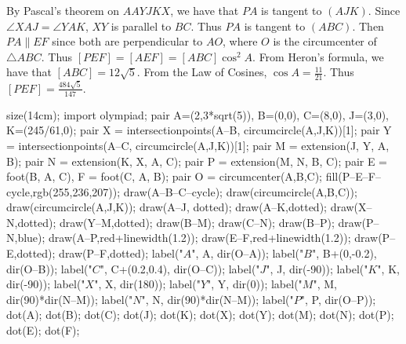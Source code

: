 By Pascal's theorem on $AAYJKX$, we have that $PA$ is tangent to $(AJK)$. Since $\angle{XAJ}=\angle{YAK}$, $XY$ is parallel to $BC$. Thus $PA$ is tangent to $(ABC)$. Then $PA\parallel EF$ since both are perpendicular to $AO$, where $O$ is the circumcenter of $\triangle{ABC}$. Thus $[PEF]=[AEF]=[ABC]\cos^2 A$. From Heron's formula, we have that $[ABC]=12\sqrt{5}$. From the Law of Cosines, $\cos A=\frac{11}{21}$. Thus $[PEF]=\frac{484\sqrt{5}}{147}$.
	\begin{center}
		\begin{asy}
			size(14cm);
			import olympiad;
			pair A=(2,3*sqrt(5)), B=(0,0), C=(8,0), J=(3,0), K=(245/61,0);
			pair X = intersectionpoints(A--B, circumcircle(A,J,K))[1];
			pair Y = intersectionpoints(A--C, circumcircle(A,J,K))[1];
			pair M = extension(J, Y, A, B);
			pair N = extension(K, X, A, C);
			pair P = extension(M, N, B, C);
			pair E = foot(B, A, C), F = foot(C, A, B);
			pair O = circumcenter(A,B,C);
			fill(P--E--F--cycle,rgb(255,236,207));
			draw(A--B--C--cycle); draw(circumcircle(A,B,C)); draw(circumcircle(A,J,K)); draw(A--J, dotted); draw(A--K,dotted); draw(X--N,dotted); draw(Y--M,dotted); draw(B--M); draw(C--N); draw(B--P); draw(P--N,blue); draw(A--P,red+linewidth(1.2)); draw(E--F,red+linewidth(1.2)); draw(P--E,dotted); draw(P--F,dotted);
			label("$A$", A, dir(O--A)); label("$B$", B+(0,-0.2), dir(O--B)); label("$C$", C+(0.2,0.4), dir(O--C)); label("$J$", J, dir(-90)); label("$K$", K, dir(-90)); label("$X$", X, dir(180)); label("$Y$", Y, dir(0)); label("$M$", M, dir(90)*dir(N--M)); label("$N$", N, dir(90)*dir(N--M)); label("$P$", P, dir(O--P));
			dot(A); dot(B); dot(C); dot(J); dot(K); dot(X); dot(Y); dot(M); dot(N); dot(P); dot(E); dot(F);
		\end{asy}
	\end{center}
	